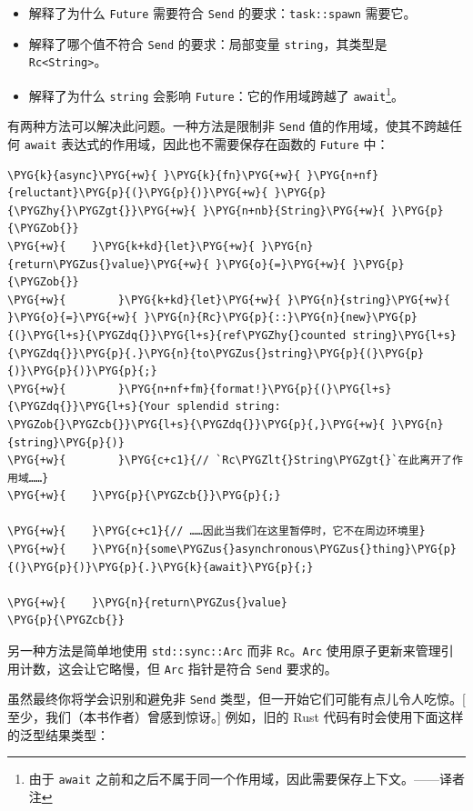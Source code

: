 \begin{itemize}
\item 解释了为什么 \texttt{Future} 需要符合 \texttt{Send} 的要求：\texttt{task::spawn} 需要它。
\item 解释了哪个值不符合 \texttt{Send} 的要求：局部变量 \texttt{string}，其类型是 \texttt{Rc<String>}。
\item 解释了为什么 \texttt{string} 会影响 \texttt{Future}：它的作用域跨越了 \texttt{await}\footnote{由于 \texttt{await} 之前和之后不属于同一个作用域，因此需要保存上下文。——译者注}。
\end{itemize}

有两种方法可以解决此问题。一种方法是限制非 \texttt{Send} 值的作用域，使其不跨越任何 \texttt{await} 表达式的作用域，因此也不需要保存在函数的 \texttt{Future} 中：

\begin{Verbatim}[commandchars=\\\{\},breaklines=true,breakanywhere=true,fontsize=\codefont,xleftmargin=17bp]
\PYG{k}{async}\PYG{+w}{ }\PYG{k}{fn}\PYG{+w}{ }\PYG{n+nf}{reluctant}\PYG{p}{(}\PYG{p}{)}\PYG{+w}{ }\PYG{p}{\PYGZhy{}\PYGZgt{}}\PYG{+w}{ }\PYG{n+nb}{String}\PYG{+w}{ }\PYG{p}{\PYGZob{}}
\PYG{+w}{    }\PYG{k+kd}{let}\PYG{+w}{ }\PYG{n}{return\PYGZus{}value}\PYG{+w}{ }\PYG{o}{=}\PYG{+w}{ }\PYG{p}{\PYGZob{}}
\PYG{+w}{        }\PYG{k+kd}{let}\PYG{+w}{ }\PYG{n}{string}\PYG{+w}{ }\PYG{o}{=}\PYG{+w}{ }\PYG{n}{Rc}\PYG{p}{::}\PYG{n}{new}\PYG{p}{(}\PYG{l+s}{\PYGZdq{}}\PYG{l+s}{ref\PYGZhy{}counted string}\PYG{l+s}{\PYGZdq{}}\PYG{p}{.}\PYG{n}{to\PYGZus{}string}\PYG{p}{(}\PYG{p}{)}\PYG{p}{)}\PYG{p}{;}
\PYG{+w}{        }\PYG{n+nf+fm}{format!}\PYG{p}{(}\PYG{l+s}{\PYGZdq{}}\PYG{l+s}{Your splendid string: \PYGZob{}\PYGZcb{}}\PYG{l+s}{\PYGZdq{}}\PYG{p}{,}\PYG{+w}{ }\PYG{n}{string}\PYG{p}{)}
\PYG{+w}{        }\PYG{c+c1}{// `Rc\PYGZlt{}String\PYGZgt{}`在此离开了作用域……}
\PYG{+w}{    }\PYG{p}{\PYGZcb{}}\PYG{p}{;}

\PYG{+w}{    }\PYG{c+c1}{// ……因此当我们在这里暂停时，它不在周边环境里}
\PYG{+w}{    }\PYG{n}{some\PYGZus{}asynchronous\PYGZus{}thing}\PYG{p}{(}\PYG{p}{)}\PYG{p}{.}\PYG{k}{await}\PYG{p}{;}

\PYG{+w}{    }\PYG{n}{return\PYGZus{}value}
\PYG{p}{\PYGZcb{}}
\end{Verbatim}

另一种方法是简单地使用 \texttt{std::sync::Arc} 而非 \texttt{Rc}。\texttt{Arc} 使用原子更新来管理引用计数，这会让它略慢，但 \texttt{Arc} 指针是符合 \texttt{Send} 要求的。

虽然最终你将学会识别和避免非 \texttt{Send} 类型，但一开始它们可能有点儿令人吃惊。[ 至少，我们（本书作者）曾感到惊讶。] 例如，旧的 Rust 代码有时会使用下面这样的泛型结果类型：

